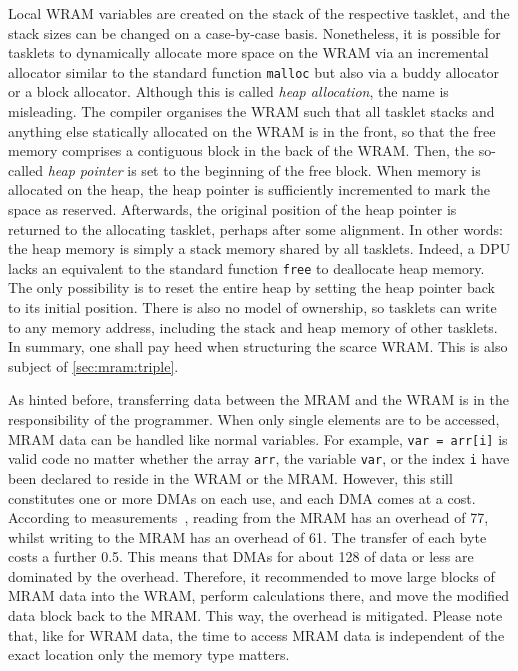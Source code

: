 Local \ac{WRAM} variables are created on the stack of the respective tasklet, and the stack sizes can be changed on a case-by-case basis.
Nonetheless, it is possible for tasklets to dynamically allocate more space on the \ac{WRAM} via an incremental allocator similar to the standard \langC{} function \lstinline|malloc| but also via a buddy allocator or a block allocator.
Although this is called \emph{heap allocation}, the name is misleading.
The compiler organises the \ac{WRAM} such that all tasklet stacks and anything else statically allocated on the \ac{WRAM} is in the front, so that the free memory comprises a contiguous block in the back of the \ac{WRAM}.
Then, the so-called \emph{heap pointer} is set to the beginning of the free block.
When memory is allocated on the heap, the heap pointer is sufficiently incremented to mark the space as reserved.
Afterwards, the original position of the heap pointer is returned to the allocating tasklet, perhaps after some alignment.
In other words:
the heap memory is simply a stack memory shared by all tasklets.
Indeed, a \ac{DPU} lacks an equivalent to the standard \langC{} function \lstinline|free| to deallocate heap memory.
The only possibility is to reset the entire heap by setting the heap pointer back to its initial position.
There is also no model of ownership, so tasklets can write to any memory address, including the stack and heap memory of other tasklets.
In summary, one shall pay heed when structuring the scarce \ac{WRAM}.
This is also subject of \cref{sec:mram:triple}.

As hinted before, transferring data between the \ac{MRAM} and the \ac{WRAM} is in the responsibility of the programmer.
When only single elements are to be accessed, \ac{MRAM} data can be handled like normal variables.
For example, \lstinline|var = arr[i]| is valid code no matter whether the array \lstinline|arr|, the variable \lstinline|var|, or the index \lstinline|i| have been declared to reside in the WRAM or the MRAM.
However, this still constitutes one or more \acp{DMA} on each use, and each \ac{DMA} comes at a cost.
According to measurements~\cite{mutlu2022Benchmarking}, reading from the \ac{MRAM} has an overhead of \qty{77}{\cycles}, whilst writing to the \ac{MRAM} has an overhead of \qty{61}{\cycles}.
The transfer of each byte costs a further \qty{0.5}{\cycles}.
This means that \acp{DMA} for about \qty{128}{\byte} of data or less are dominated by the overhead.
Therefore, it recommended to move large blocks of \ac{MRAM} data into the \ac{WRAM}, perform calculations there, and move the modified data block back to the \ac{MRAM}.
This way, the overhead is mitigated.
Please note that, like for \ac{WRAM} data, the time to access \ac{MRAM} data is independent of the exact location \Dash only the memory type matters.

